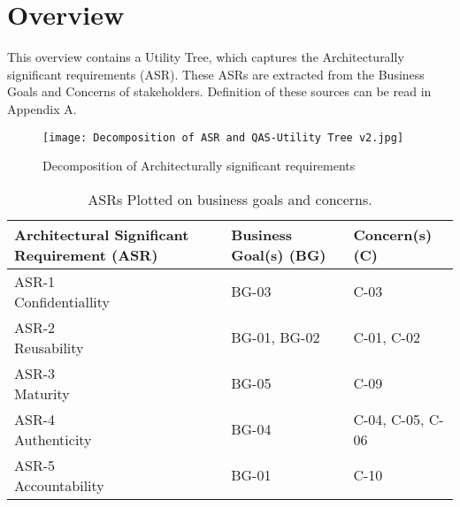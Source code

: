 \chapter{Overview}\label{s:overview}
This overview contains a Utility Tree, which captures the Architecturally significant requirements (ASR). These ASRs are extracted from the Business Goals and Concerns of stakeholders. Definition of these sources can be read in Appendix A.

\graphicspath{ {./images/} }
\begin{figure}[t]
\texttt{[image: Decomposition of ASR and QAS-Utility Tree v2.jpg]}\\
\caption{Decomposition of Architecturally significant requirements}
\label{fig:ASR1}
\end{figure}

\begin{table}[h!]
\centering
\begin{tabular}{||l l l||} 
 \hline
 Architectural Significant Requirement (ASR) & Business Goal(s) (BG) & Concern(s) (C)\\ [0.5ex] 
 \hline\hline
 \makecell{ASR-1 \\ Confidentiallity} & BG-03 & C-03 \\ 
 \hline
\makecell{ASR-2 \\ Reusability} & BG-01, BG-02 & C-01, C-02  \\
  \hline
\makecell{ASR-3 \\ Maturity} & BG-05 &  C-09  \\
  \hline
\makecell{ASR-4 \\ Authenticity} & BG-04 & C-04, C-05, C-06 \\
  \hline
\makecell{ASR-5 \\ Accountability} & BG-01 & C-10  \\ [1ex] 
 \hline
\end{tabular}
\caption{ASRs Plotted on business goals and concerns.}
\label{ASR_BG_C}
\end{table}

